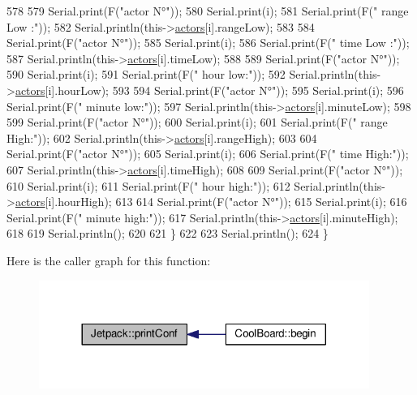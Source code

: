 \begin{DoxyCode}
578 
579         Serial.print(F(\textcolor{stringliteral}{"actor N°"}));
580         Serial.print(i);
581         Serial.print(F(\textcolor{stringliteral}{" range Low :"}));
582         Serial.println(this->\hyperlink{class_jetpack_a7e16d2f97837f9712a2e6de1c50d99db}{actors}[i].rangeLow);
583 
584         Serial.print(F(\textcolor{stringliteral}{"actor N°"}));
585         Serial.print(i);
586         Serial.print(F(\textcolor{stringliteral}{" time Low :"}));
587         Serial.println(this->\hyperlink{class_jetpack_a7e16d2f97837f9712a2e6de1c50d99db}{actors}[i].timeLow);
588 
589         Serial.print(F(\textcolor{stringliteral}{"actor N°"}));
590         Serial.print(i);
591         Serial.print(F(\textcolor{stringliteral}{" hour low:"}));
592         Serial.println(this->\hyperlink{class_jetpack_a7e16d2f97837f9712a2e6de1c50d99db}{actors}[i].hourLow);
593 
594         Serial.print(F(\textcolor{stringliteral}{"actor N°"}));
595         Serial.print(i);
596         Serial.print(F(\textcolor{stringliteral}{" minute low:"}));
597         Serial.println(this->\hyperlink{class_jetpack_a7e16d2f97837f9712a2e6de1c50d99db}{actors}[i].minuteLow);
598 
599         Serial.print(F(\textcolor{stringliteral}{"actor N°"}));
600         Serial.print(i);
601         Serial.print(F(\textcolor{stringliteral}{" range High:"}));
602         Serial.println(this->\hyperlink{class_jetpack_a7e16d2f97837f9712a2e6de1c50d99db}{actors}[i].rangeHigh);
603 
604         Serial.print(F(\textcolor{stringliteral}{"actor N°"}));
605         Serial.print(i);
606         Serial.print(F(\textcolor{stringliteral}{" time High:"}));
607         Serial.println(this->\hyperlink{class_jetpack_a7e16d2f97837f9712a2e6de1c50d99db}{actors}[i].timeHigh);
608 
609         Serial.print(F(\textcolor{stringliteral}{"actor N°"}));
610         Serial.print(i);
611         Serial.print(F(\textcolor{stringliteral}{" hour high:"}));
612         Serial.println(this->\hyperlink{class_jetpack_a7e16d2f97837f9712a2e6de1c50d99db}{actors}[i].hourHigh);
613 
614         Serial.print(F(\textcolor{stringliteral}{"actor N°"}));
615         Serial.print(i);
616         Serial.print(F(\textcolor{stringliteral}{" minute high:"}));
617         Serial.println(this->\hyperlink{class_jetpack_a7e16d2f97837f9712a2e6de1c50d99db}{actors}[i].minuteHigh);
618 
619         Serial.println(); 
620 
621     \}
622 
623     Serial.println();
624 \}
\end{DoxyCode}
Here is the caller graph for this function\+:
\nopagebreak
\begin{figure}[H]
\begin{center}
\leavevmode
\includegraphics[width=305pt]{df/d1d/class_jetpack_ac54a7bb4f9166bee32052253d9b1d306_icgraph}
\end{center}
\end{figure}
